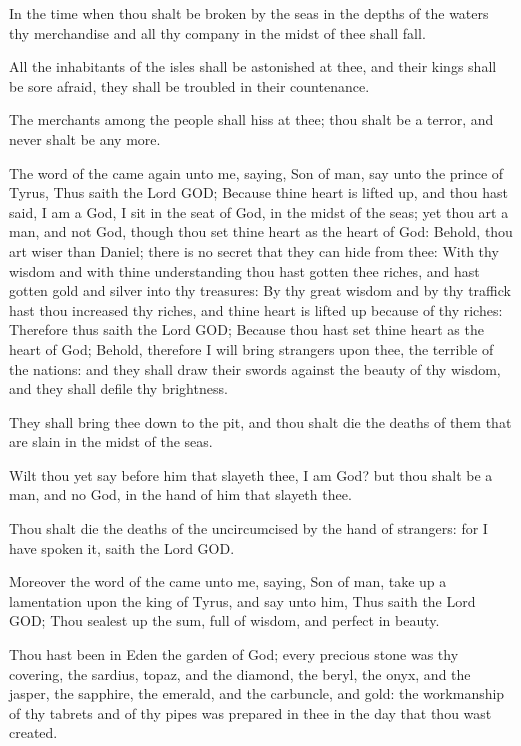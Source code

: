 \Verse In the time when thou shalt be broken by the seas in the depths of the waters thy merchandise and all thy company in the midst of thee shall fall.

\Verse All the inhabitants of the isles shall be astonished at thee, and their kings shall be sore afraid, they shall be troubled in their countenance.

\Verse The merchants among the people shall hiss at thee; thou shalt be a terror, and never shalt be any more.


\Chapter
\Verse The word of the \LORD came again unto me, saying, \Verse Son of man, say unto the prince of Tyrus, Thus saith the Lord GOD; Because thine heart is lifted up, and thou hast said, I am a God, I sit in the seat of God, in the midst of the seas; yet thou art a man, and not God, though thou set thine heart as the heart of God: \Verse Behold, thou art wiser than Daniel; there is no secret that they can hide from thee: \Verse With thy wisdom and with thine understanding thou hast gotten thee riches, and hast gotten gold and silver into thy treasures: \Verse By thy great wisdom and by thy traffick hast thou increased thy riches, and thine heart is lifted up because of thy riches: \Verse Therefore thus saith the Lord GOD; Because thou hast set thine heart as the heart of God; \Verse Behold, therefore I will bring strangers upon thee, the terrible of the nations: and they shall draw their swords against the beauty of thy wisdom, and they shall defile thy brightness.

\Verse They shall bring thee down to the pit, and thou shalt die the deaths of them that are slain in the midst of the seas.

\Verse Wilt thou yet say before him that slayeth thee, I am God? but thou shalt be a man, and no God, in the hand of him that slayeth thee.

\Verse Thou shalt die the deaths of the uncircumcised by the hand of strangers: for I have spoken it, saith the Lord GOD.

\Verse Moreover the word of the \LORD came unto me, saying, \Verse Son of man, take up a lamentation upon the king of Tyrus, and say unto him, Thus saith the Lord GOD; Thou sealest up the sum, full of wisdom, and perfect in beauty.

\Verse Thou hast been in Eden the garden of God; every precious stone was thy covering, the sardius, topaz, and the diamond, the beryl, the onyx, and the jasper, the sapphire, the emerald, and the carbuncle, and gold: the workmanship of thy tabrets and of thy pipes was prepared in thee in the day that thou wast created.

